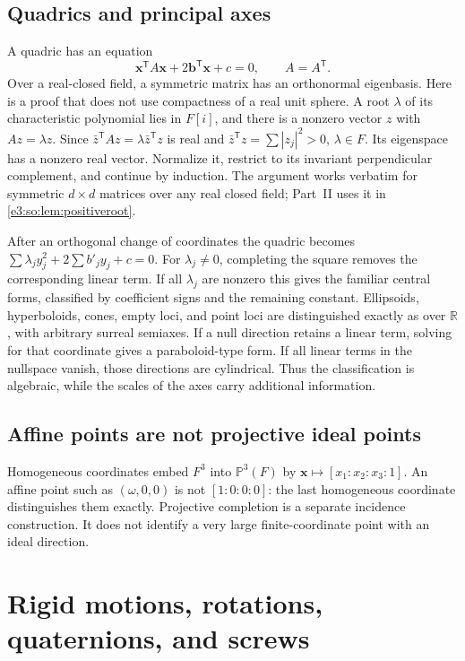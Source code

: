 \documentclass[11pt,letterpaper]{article}
\numberwithin{equation}{section}
\theoremstyle{definition}
\theoremstyle{remark}
\newcommand{\R}{\mathbb R}
\newcommand{\vv}[1]{\bm{#1}}
\newcommand{\transpose}{^{\mathsf T}}
\begin{document}
\subsection{Quadrics and principal axes}\label{e3:sub:quadrics}

A quadric has an equation
\[
 \vv x\transpose A\vv x+2\vv b\transpose\vv x+c=0,
 \qquad A=A\transpose.
\]
Over a real-closed field, a symmetric matrix has an orthonormal eigenbasis.
Here is a proof that does not use compactness of a real unit sphere. A root
$\lambda$ of its characteristic polynomial lies in $F[i]$, and there is a
nonzero vector $z$ with $Az=\lambda z$. Since
$\bar z\transpose A z=\lambda\bar z\transpose z$ is real and
$\bar z\transpose z=\sum |z_j|^2>0$, $\lambda\in F$. Its eigenspace has a
nonzero real vector. Normalize it, restrict to its invariant perpendicular
complement, and continue by induction. The argument works verbatim for
symmetric $d\times d$ matrices over any real closed field; Part~II uses it in
\cref{e3:so:lem:positiveroot}.

After an orthogonal change of coordinates the quadric becomes
$\sum\lambda_j y_j^2+2\sum b'_j y_j+c=0$.
For $\lambda_j\ne0$, completing the square removes the corresponding linear
term. If all $\lambda_j$ are nonzero this gives the familiar central forms,
classified by coefficient signs and the remaining constant. Ellipsoids,
hyperboloids, cones, empty loci, and point loci are distinguished exactly as
over $\R$, with arbitrary surreal semiaxes. If a null direction retains a
linear term, solving for that coordinate gives a paraboloid-type form.
If all linear terms in the nullspace vanish, those directions are cylindrical.
Thus the classification is algebraic, while the scales of the axes carry
additional information.

\subsection{Affine points are not projective ideal points}

Homogeneous coordinates embed $F^3$ into $\mathbb P^3(F)$ by
$\vv x\mapsto[x_1:x_2:x_3:1]$. An affine point such as $(\omega,0,0)$ is
not $[1:0:0:0]$: the last homogeneous coordinate distinguishes them exactly.
Projective completion is a separate incidence construction. It does not
identify a very large finite-coordinate point with an ideal direction.

\section{Rigid motions, rotations, quaternions, and screws}\label{e3:sec:rotations}
\end{document}
